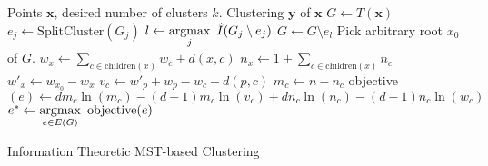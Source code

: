 \begin{algorithm}[t]
\begin{algorithmic}
    \Require Points $\mathbf{x}$, desired number of clusters $k$.
    \Ensure Clustering $\mathbf{y}$ of $\mathbf{x}$
    \State $G \leftarrow T(\mathbf{x})$
            \State $e_j \leftarrow \text{SplitCluster}(G_j)$
        \EndFor
        \State $l \leftarrow \displaystyle \operatorname*{argmax}_j\  \hat{I}(G_j \setminus e_j)$
        \State $G \leftarrow G \setminus e_l$
    \EndFor
    \Statex
        \State Pick arbitrary root $x_0$ of $G$.
            \State $w_x \leftarrow \displaystyle \sum_{c \in \text{children}(x)} w_c + d(x, c)$
            \State $n_x \leftarrow \displaystyle 1 + \sum_{c \in \text{children}(x)} n_c$
        \EndFor
        \State $w'_x \leftarrow w_{x_0} - w_x$
        \EndFor
            \State $v_c \leftarrow w'_p + w_p - w_c - d(p,c)$
            \State $m_c \leftarrow n - n_c$
            \State objective$(e) \leftarrow d m_c \ln(m_c) - (d-1) m_c \ln(v_c) + d n_c \ln(n_c) - (d-1) n_c \ln (w_c)$
        \EndFor
        \State $e^* \leftarrow \displaystyle \operatorname*{argmax}_{e \in E(G)} \ \text{objective}(e)$
        
    \EndFunction
\end{algorithmic}
\caption{Information Theoretic MST-based Clustering\label{overall}}

\end{algorithm}

